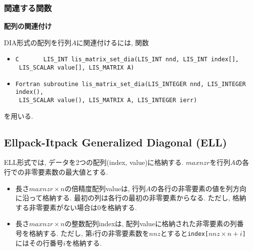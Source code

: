 \documentclass[a4paper]{jarticle}
\begin{document}
{{\subsubsection{関連する関数}
\noindent
{\bf 配列の関連付け}

DIA形式の配列を行列$A$に関連付けるには, 関数
\begin{itemize}
\item \verb|C       LIS_INT lis_matrix_set_dia(LIS_INT nnd, LIS_INT index[],|\\
      \verb| LIS_SCALAR value[], LIS_MATRIX A)|
\item \verb|Fortran subroutine lis_matrix_set_dia(LIS_INTEGER nnd, LIS_INTEGER index(),|\\
      \verb| LIS_SCALAR value(), LIS_MATRIX A, LIS_INTEGER ierr)|
\end{itemize}
を用いる. 

\newpage
\subsection{Ellpack-Itpack Generalized Diagonal (ELL)}
ELL形式では, データを2つの配列({\ttfamily index, value})に格納する. 
$maxnzr$を行列$A$の各行での非零要素数の最大値とする. 
\begin{itemize}
\item 長さ$maxnzr \times n$の倍精度配列{\ttfamily value}は, 行列$A$の各行の非零要素の値を列方向に沿って格納する. 
最初の列は各行の最初の非零要素からなる. ただし, 格納する非零要素がない場合は$0$を格納する. 
\item 長さ$maxnzr \times n$の整数配列{\ttfamily index}は, 
配列{\ttfamily value}に格納された非零要素の列番号を格納する. 
ただし, 第$i$行の非零要素数を$nnz$とすると{\tt index[$nnz \times n + i$]}にはその行番号$i$を格納する. 
\end{itemize}

}}
\end{document}
